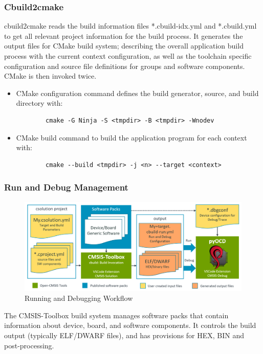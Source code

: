 \subsubsection{Cbuild2cmake}
cbuild2cmake reads the build information files *.cbuild-idx.yml and *.cbuild.yml to get all relevant project information for the build process. It generates the  output files for CMake build system; describing the overall application build process with the current context configuration, as well as the toolchain specific configuration and source file definitions for groups and software components. CMake is then invoked twice.
\begin{itemize}
    \item
    CMake configuration command defines the build generator, source, and build directory with:
    \begin{lstlisting}
        cmake -G Ninja -S <tmpdir> -B <tmpdir> -Wnodev
    \end{lstlisting}
    \item
    CMake build command to build the application program for each context with:
    \begin{lstlisting}
        cmake --build <tmpdir> -j <n> --target <context>
    \end{lstlisting}
\end{itemize}
\subsubsection{Run and Debug Management}
\begin{figure}[H]
    \centering
    \includegraphics[width=15cm]{img/ST_Summer_Internship/cbuild-run.png}
    \caption{Running and Debugging Workflow}
    \label{fig:debug_wf}
\end{figure}
The CMSIS-Toolbox build system manages software packs that contain information about device, board, and software components. It controls the build output (typically ELF/DWARF files), and has provisions for HEX, BIN and post-processing.
